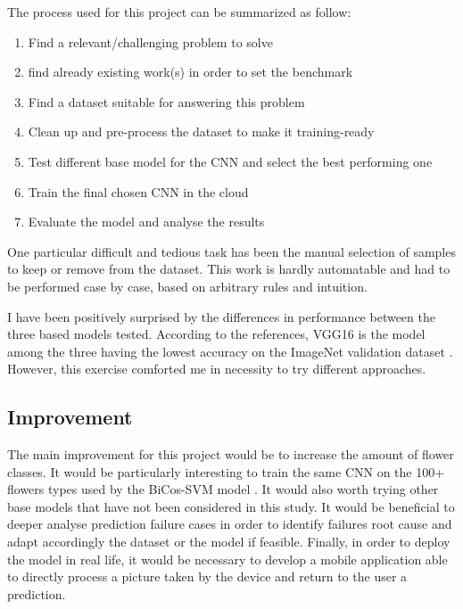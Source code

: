 The process used for this project can be summarized as follow:

\begin{enumerate}
	\item Find a relevant/challenging problem to solve
	\item find already existing work(s) in order to set the benchmark
	\item Find a dataset suitable for answering this problem
	\item Clean up and pre-process the dataset to make it training-ready
	\item Test different base model for the CNN and select the best performing one
	\item Train the final chosen CNN in the cloud
	\item Evaluate the model and analyse the results
\end{enumerate}

One particular difficult and tedious task has been the manual selection of samples to keep or remove from the dataset. This work is hardly automatable and had to be performed case by case, based on arbitrary rules and intuition. 

I have been positively surprised by the differences in performance between the three based models tested. According to the references, VGG16 is the model among the three having the lowest accuracy on the ImageNet validation dataset \cite{Keras_applications}. However, this exercise comforted me in necessity to try different approaches.  

\subsection{Improvement}

The main improvement for this project would be to increase the amount of flower classes. It would be particularly interesting to train the same CNN on the 100+ flowers types used by the BiCos-SVM model \cite{Chai_BiCos_demo}.
It would also worth trying other base models that have not been considered in this study.
It would be beneficial to deeper analyse prediction failure cases in order to identify failures root cause and adapt accordingly the dataset or the model if feasible.
Finally, in order to deploy the model in real life, it would be necessary to develop a mobile application able to directly process a picture taken by the device and return to the user a prediction.